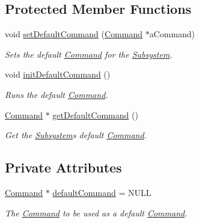 \subsection*{Protected Member Functions}
\begin{DoxyCompactItemize}
\item 
void \mbox{\hyperlink{classlib_iterative_robot_1_1_subsystem_a6fff5c5756245ac750c2b26ee0ed2be7}{set\+Default\+Command}} (\mbox{\hyperlink{classlib_iterative_robot_1_1_command}{Command}} $\ast$a\+Command)
\begin{DoxyCompactList}\small\item\em Sets the default \mbox{\hyperlink{classlib_iterative_robot_1_1_command}{Command}} for the \mbox{\hyperlink{classlib_iterative_robot_1_1_subsystem}{Subsystem}}. \end{DoxyCompactList}\item 
\mbox{\label{classlib_iterative_robot_1_1_subsystem_a30bd6c33c84c896f31ed01c8331aab57}} 
void \mbox{\hyperlink{classlib_iterative_robot_1_1_subsystem_a30bd6c33c84c896f31ed01c8331aab57}{init\+Default\+Command}} ()
\begin{DoxyCompactList}\small\item\em Runs the default \mbox{\hyperlink{classlib_iterative_robot_1_1_command}{Command}}. \end{DoxyCompactList}\item 
\mbox{\hyperlink{classlib_iterative_robot_1_1_command}{Command}} $\ast$ \mbox{\hyperlink{classlib_iterative_robot_1_1_subsystem_a7e0c4904d9ff8ad2e4b6bc98d0f9579f}{get\+Default\+Command}} ()
\begin{DoxyCompactList}\small\item\em Get the \mbox{\hyperlink{classlib_iterative_robot_1_1_subsystem}{Subsystem}}\textquotesingle{}s default \mbox{\hyperlink{classlib_iterative_robot_1_1_command}{Command}}. \end{DoxyCompactList}\end{DoxyCompactItemize}
\subsection*{Private Attributes}
\begin{DoxyCompactItemize}
\item 
\mbox{\label{classlib_iterative_robot_1_1_subsystem_a1a98d727550c3a59b6a852b3ec7277cb}} 
\mbox{\hyperlink{classlib_iterative_robot_1_1_command}{Command}} $\ast$ \mbox{\hyperlink{classlib_iterative_robot_1_1_subsystem_a1a98d727550c3a59b6a852b3ec7277cb}{default\+Command}} = N\+U\+LL
\begin{DoxyCompactList}\small\item\em The \mbox{\hyperlink{classlib_iterative_robot_1_1_command}{Command}} to be used as a default \mbox{\hyperlink{classlib_iterative_robot_1_1_command}{Command}}. \end{DoxyCompactList}\end{DoxyCompactItemize}
